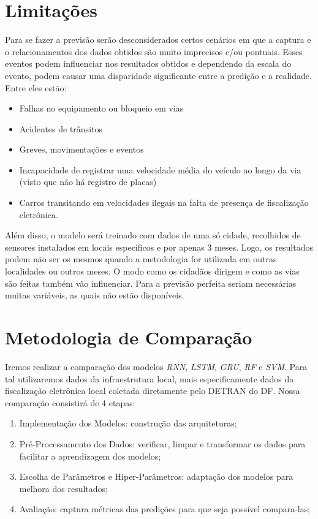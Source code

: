 \section{Limitações}

Para se fazer a previsão serão desconsiderados certos cenários em que a captura e o relacionamentos dos dados obtidos são muito imprecisos e/ou pontuais. Esses eventos podem influenciar nos resultados obtidos e dependendo da escala do evento, podem causar uma disparidade significante entre a predição e a realidade. Entre eles estão:

\begin{itemize}
    \item Falhas no equipamento ou bloqueio em vias
    \item Acidentes de trânsitos
    \item Greves, movimentações e eventos
    \item Incapacidade de registrar uma velocidade média do veículo ao longo da via (visto que não há registro de placas)
    \item Carros transitando em velocidades ilegais na falta de presença de fiscalização eletrônica.
\end{itemize}

Além disso, o modelo será treinado com dados de uma só cidade, recolhidos de sensores instalados em locais específicos e por apenas 3 meses. Logo, os resultados podem não ser os mesmos quando a metodologia for utilizada em outras localidades ou outros meses. O modo como os cidadãos dirigem e como as vias são feitas também vão influenciar. Para a previsão perfeita seriam necessárias muitas variáveis, as quais não estão disponíveis.

\section{Metodologia de Comparação}

Iremos realizar a comparação dos modelos \textit{\acrshort{RNN}}, \textit{\acrshort{LSTM}}, \textit{\acrshort{GRU}}, \textit{\acrshort{RF}} e \textit{\acrshort{SVM}}. Para tal utilizaremos dados da infraestrutura local, mais especificamente dados da fiscalização eletrônica local coletada diretamente pelo \acrfull{DETRAN} do \acrfull{DF}. Nossa comparação consistirá de 4 etapas:

\begin{enumerate}
    \item Implementação dos Modelos: construção das arquiteturas;
    \item Pré-Processamento dos Dados: verificar, limpar e transformar os dados para facilitar a aprendizagem dos modelos;
    \item Escolha de Parâmetros e Hiper-Parâmetros: adaptação dos modelos para melhora dos resultados;
    \item Avaliação: captura métricas das predições para que seja possível compara-las;
\end{enumerate}


